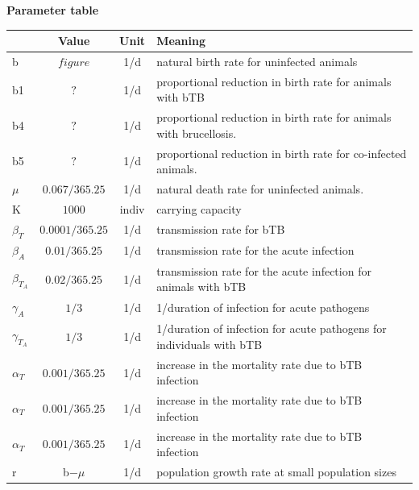\documentclass[letterpaper,12pt]{article}
\begin{document}



\pagebreak

\textbf{Parameter table}
\begin{table}[hb]
\newcommand{\head}[1]{\textnormal{\textbf{#1}}}
\small
\begin{tabular}{lccp{12cm}}
\hline
\head{ } & \head{Value} & \head{Unit} & \head{Meaning}\\
\hline
b & $ figure $ & 1/d &  natural birth rate for uninfected animals \\
b1 & $?$ & 1/d & proportional reduction in birth rate for animals with bTB \\
b4 & $? $ & 1/d &proportional reduction in birth rate for animals with brucellosis.  \\
b5& $? $ & 1/d & proportional reduction in birth rate for co-infected animals.  \\

$\mu$& $0.067/365.25$& 1/d& natural death rate for uninfected animals.\\
K& $1000$& indiv & carrying capacity \\
 $\beta_T$& $0.0001/365.25$& 1/d& transmission rate for bTB \\
 $\beta_A$& $0.01/365.25$& 1/d& transmission rate for the acute infection \\
 $\beta_{T_A}$& $0.02/365.25$& 1/d& transmission rate for the acute infection for animals with bTB \\
 $\gamma_A$& $1/3$& 1/d& 1/duration of infection for acute pathogens \\
 $\gamma_{T_A}$& $1/3$& 1/d& 1/duration of infection for acute pathogens for individuals with bTB \\
 $\alpha_T$& $0.001/365.25$& 1/d& increase in the mortality rate due to bTB infection \\
  $\alpha_T$& $0.001/365.25$& 1/d& increase in the mortality rate due to bTB infection \\ 
 $\alpha_T$& $0.001/365.25$ & 1/d& increase in the mortality rate due to bTB infection \\
 r & b$-\mu$ & 1/d & population growth rate at small population sizes \\
\hline 
\end{tabular}
\end{table}
\\
\pagebreak
\end{document}
